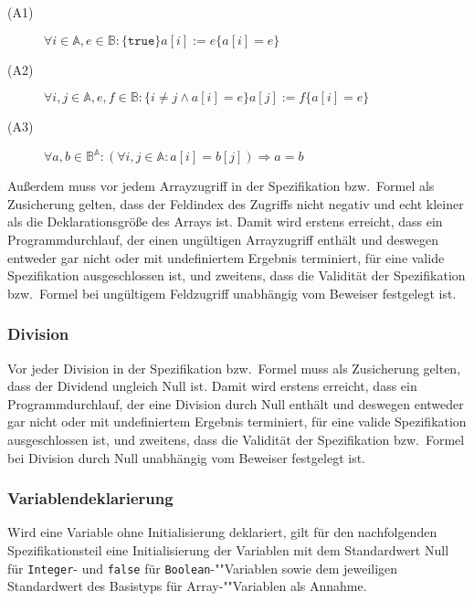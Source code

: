 \begin{description}%
    \item[(A1)] \begin{math}\forall i \in \mathbb{A}, e \in \mathbb{B} : \{\texttt{true}\} a[i] := e \{a[i] = e\}\end{math}%
    \item[(A2)] \begin{math}\forall i, j \in \mathbb{A}, e, f \in \mathbb{B} : \{i \neq j \wedge a[i] = e\} a[j] := f \{a[i] = e\}\end{math}%
    \item[(A3)] \begin{math}\forall a, b \in \mathbb{B}^\mathbb{A} : (\forall i, j \in \mathbb{A} : a[i] = b[j]) \Rightarrow a = b\end{math}%
\end{description}%

Außerdem muss vor jedem Arrayzugriff in der Spezifikation bzw.\ Formel
als Zusicherung gelten, dass der Feldindex des Zugriffs nicht negativ
und echt kleiner als die Deklarationsgröße des Arrays ist. Damit wird
erstens erreicht, dass ein Programmdurchlauf, der einen ungültigen
Arrayzugriff enthält und deswegen entweder gar nicht oder mit
undefiniertem Ergebnis terminiert, für eine valide Spezifikation
ausgeschlossen ist, und zweitens, dass die Validität der Spezifikation
bzw.\ Formel bei ungültigem Feldzugriff unabhängig vom Beweiser
festgelegt ist.%

\subsubsection{Division}%

Vor jeder Division in der Spezifikation bzw.\ Formel muss als
Zusicherung gelten, dass der Dividend ungleich Null ist. Damit wird
erstens erreicht, dass ein Programmdurchlauf, der eine Division durch
Null enthält und deswegen entweder gar nicht oder mit undefiniertem
Ergebnis terminiert, für eine valide Spezifikation ausgeschlossen ist,
und zweitens, dass die Validität der Spezifikation bzw.\ Formel bei
Division durch Null unabhängig vom Beweiser festgelegt ist.%

\subsubsection{Variablendeklarierung}%

Wird eine Variable ohne Initialisierung deklariert, gilt für den
nachfolgenden Spezifikationsteil eine Initialisierung der Variablen
mit dem Standardwert Null für \texttt{Integer}- und \texttt{false} für
\texttt{Boolean}-""Variablen sowie dem jeweiligen Standardwert des
Basistyps für Array-""Variablen als Annahme.%

